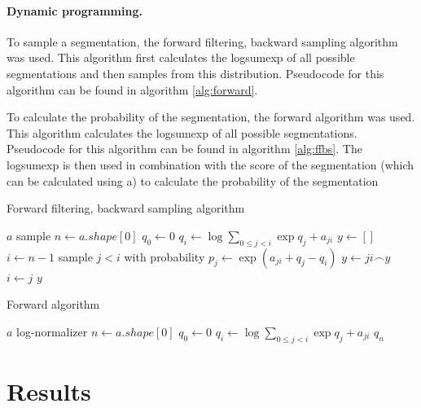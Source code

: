 \paragraph{Dynamic programming.} To sample a segmentation, the forward filtering, backward sampling algorithm \cite{FFBS} was used.
This algorithm first calculates the logsumexp of all possible segmentations and then samples from this distribution.
Pseudocode for this algorithm can be found in algorithm \ref{alg:forward}.

To calculate the probability of the segmentation, the forward algorithm was used.
This algorithm calculates the logsumexp of all possible segmentations.
Pseudocode for this algorithm can be found in algorithm \ref{alg:ffbs}.
The logsumexp is then used in combination with the score of the segmentation (which can be calculated using a) to calculate the probability of the segmentation

\begin{algorithm}
\caption{Forward filtering, backward sampling algorithm}
\label{alg:ffbs}
\begin{algorithmic}
\Require $a$
\Ensure sample
\State
\State $n \gets a.shape[0]$
\State $q_0 \gets 0$
    \State $q_i \gets \log \sum_{0 \leq j < i} \exp q_j + a_{ji}$
\EndFor
\State
\State $y \gets []$
\State $i \gets n - 1$
    \State sample $j < i$ with probability $p_j \gets \exp (a_{ji} + q_j - q_i)$
    \State $y \gets ji \frown y$
    \State $i \gets j$
\EndWhile
\State
\State \Return $y$
\end{algorithmic}
\end{algorithm}

\begin{algorithm}
\caption{Forward algorithm}
\label{alg:forward}
\begin{algorithmic}
\Require $a$
\Ensure log-normalizer
\State
\State $n \gets a.shape[0]$
\State $q_0 \gets 0$
    \State $q_i \gets \log \sum_{0 \leq j < i} \exp q_j + a_{ji}$
\EndFor
\State
\State \Return $q_n$
\end{algorithmic}
\end{algorithm}


\section{Results}
